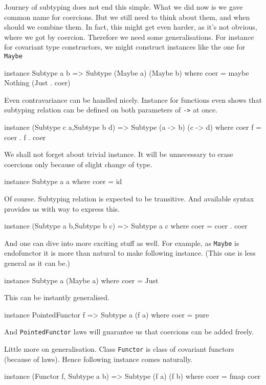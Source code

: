 \documentclass[11pt,oneside,draft]{fithesis2}
\theoremstyle{definition}
\begin{document}
Journey of subtyping does not end this simple. What we did now
is we gave common name for coercions. But we still need to
think about them, and when should we combine them.
In fact, this might get even harder, as it's not
obvious, where we got by coercion. Therefore we need
some generalisations. For instance for covariant type
constructors, we might construct instances like the
one for \texttt{Maybe}

\begin{code}
instance Subtype a b => Subtype (Maybe a) (Maybe b) where
    coer = maybe Nothing (Just . coer)
\end{code}

Even contravariance can be handled nicely. Instance for functions
even shows that subtyping relation can be defined on both parameters
of \texttt{->} at once.
\begin{code}
instance (Subtype c a,Subtype b d)
    => Subtype (a -> b) (c -> d) where
        coer f = coer . f . coer
\end{code}

We shall not forget about trivial instance. It will be unnecessary
to erase coercions only because of slight change of type.
\begin{code}
instance Subtype a a where
    coer = id
\end{code}

Of course. Subtyping relation is expected to be transitive.
And available syntax provides us with way to express this.
\begin{code}
instance (Subtype a b,Subtype b c) => Subtype a c where
    coer = coer . coer
\end{code}

And one can dive into more exciting stuff as well. For example,
as \texttt{Maybe} is endofunctor it is more than natural to make following instance.
(This one is less general as it can be.)
\begin{code}
instance Subtype a (Maybe a) where
    coer = Just
\end{code}
This can be instantly generalised.
\begin{code}
instance PointedFunctor f => Subtype a (f a) where
    coer = pure
\end{code}
And \texttt{PointedFunctor} laws will guarantee us that coercions
can be added freely.

Little more on generalisation. Class \texttt{Functor}
is class of covariant functors (because of laws). Hence
following instance comes naturally.
\begin{code}
instance (Functor f, Subtype a b) => Subtype (f a) (f b) where
    coer = fmap coer
\end{code}
\end{document}
